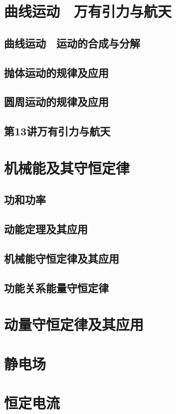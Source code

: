 \documentclass[cn,11pt]{elegantbook}
\begin{document}
\chapter{曲线运动　万有引力与航天}

   \section{曲线运动　运动的合成与分解}
   \section{抛体运动的规律及应用}
   \section{圆周运动的规律及应用}
   \section{第13讲万有引力与航天}

\chapter{机械能及其守恒定律}

   \section{功和功率}
   \section{动能定理及其应用}
   \section{机械能守恒定律及其应用}
   \section{功能关系能量守恒定律}

\chapter{动量守恒定律及其应用}
\chapter{静电场}
\chapter{恒定电流}
\end{document}
